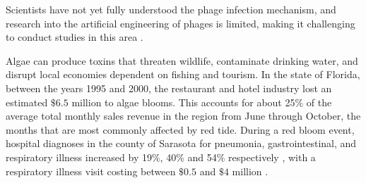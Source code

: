 Scientists have not yet fully understood the phage infection mechanism, and research into the artificial engineering of phages is limited, making it challenging to conduct studies in this area \cite{grassoReviewCyanophageHost2022, mckindlesDissolvedMicrocystinRelease2020}.
 
Algae can produce toxins that threaten wildlife, contaminate drinking water, and disrupt local economies dependent on fishing and tourism.
In the state of Florida, between the years 1995 and 2000, the restaurant and hotel industry lost an estimated $\$6.5$ million to algae blooms.
This accounts for about 25\% of the average total monthly sales revenue in the region from June through October, the months that are most commonly affected by red tide\cite{PDFEconomicImpacts}.
During a red bloom event, hospital diagnoses in the county of Sarasota for pneumonia, gastrointestinal, and respiratory illness increased by 19\%, 40\% and 54\% respectively \cite{chengCharacterizationMarineAerosol2005, kirkpatrickGastrointestinalEmergencyRoom2010}, with a respiratory illness visit costing between $\$0.5$ and $\$4$ million \cite{hoaglandCostsRespiratoryIllnesses2009}. 
